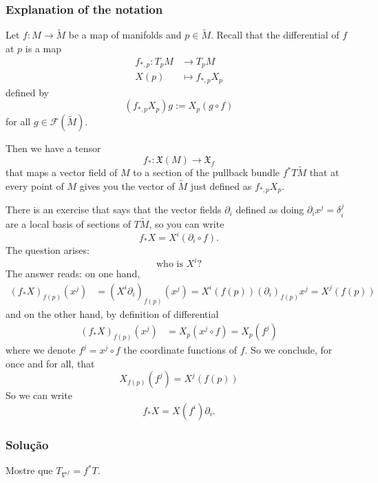 \subsubsection*{Explanation of the notation}
Let \(f:M \to \tilde{M}\) be a map of manifolds and \(p \in \tilde{M}\).  Recall that the differential of \(f\) at \(p\) is a map
\begin{align*}
	f_{*,p}: T_pM &\longrightarrow T_pM \\
	X(p) &\longmapsto f_{*,p}X_p
\end{align*}
defined by
\[(f_{*,p}X_p)g:=X_p(g \circ f)\]
for all \(g \in \mathcal{F}(\tilde{M})\).

Then we have a tensor
\[f_*:\mathfrak{X}(M) \longrightarrow \mathfrak{X}_f\]
that maps a vector field of \(M\) to a section of the pullback bundle \(f^*T\tilde{M}\) that at every point  of \(M\) gives you the vector of \(\tilde{M}\) just defined as \(f_{*,p}X_p\).

There is an exercise that says that the vector fields \(\partial_i\) defined as doing \(\partial_i x^j=\delta_i^j\) are a local basis of sections of \(T\tilde{M}\), so you can write
\[f_* X=X^i(\partial_i \circ f).\]
The question arises:
\[\text{who is } X^i\text{?} \]
The answer reads: on one hand,
\begin{align*}
	(f_*X)_{f(p)}(x^j)&=(X^i \partial_i)_{f(p)}(x^j)=X^i(f(p))(\partial_i)_{f(p)}x^j=X^j(f(p))
\end{align*}
and on the other hand, by definition of differential
\begin{align*}
	(f_*X)_{f(p)}(x^j)&=X_p(x^j\circ f)=X_p(f^j)
\end{align*}
where we denote \(f^j=x^j \circ f\) the coordinate functions of \(f\). So we conclude, for once and for all, that
\[X_{f(p)}(f^j)=X^j(f(p))\]
So we can write
\[f_*X=X(f^i)\partial_i.\]

\subsubsection*{Solução}

\begin{exercise}\leavevmode
Mostre que \(T_{\nabla^f}=f^*T\).
\end{exercise}

